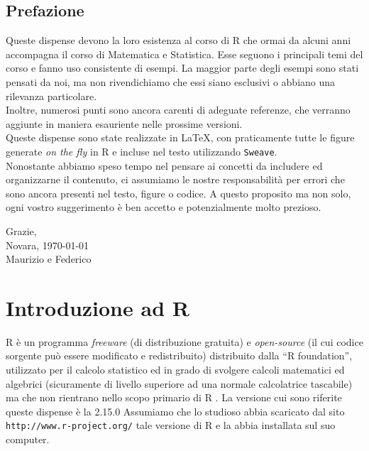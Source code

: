 \documentclass[onecolumn,11pt]{book}
\author{Federico Comoglio e  Maurizio Rinaldi}
\begin{document}

\markright{\today}
\thispagestyle{empty} 
\maketitle
\newpage
\thispagestyle{empty} 
\tableofcontents
\newpage
\thispagestyle{empty} 
 \mainmatter
\section*{Prefazione}
\rhead{}
Queste dispense devono la loro  esistenza al corso di \textsf{R} che ormai da alcuni anni accompagna il corso di Matematica e Statistica. Esse seguono i principali temi del corso e fanno uso consistente di esempi. La maggior parte degli esempi sono stati pensati da noi, ma non rivendichiamo che essi siano esclusivi o abbiano una rilevanza particolare.\\
Inoltre, numerosi punti sono ancora carenti di adeguate referenze, che verranno aggiunte in maniera esauriente nelle prossime versioni.\\
Queste dispense sono state realizzate in \LaTeX, con praticamente tutte le figure generate \textit{on the fly} in \textsf{R} e incluse nel testo utilizzando \texttt{Sweave}.\\
Nonostante abbiamo speso tempo nel pensare ai concetti da includere ed organizzarne il contenuto, ci assumiamo le nostre responsabilit\`a per errori che sono ancora presenti nel testo, figure o codice. A questo proposito ma non solo, ogni vostro suggerimento \`e ben accetto e potenzialmente molto prezioso.\\
\begin{flushright}
Grazie,\\
Novara, \today \\ 
Maurizio e Federico
\end{flushright}
\vfill\eject
 \thispagestyle{empty} 
\chapter{Introduzione ad \textsf{R}}
{\textsf R} \`e un programma \textit{freeware} (di distribuzione gratuita) e \textit{open-source} (il cui codice sorgente pu\`o essere modificato e redistribuito) distribuito dalla ``\textsf{R} foundation'', utilizzato per il calcolo statistico ed in grado di svolgere calcoli matematici ed algebrici (sicuramente di livello superiore ad una normale calcolatrice tascabile) ma che non rientrano nello scopo primario di \textsf{R} . La versione cui sono riferite queste dispense \`e la  2.15.0  Assumiamo che lo studioso abbia scaricato dal sito  \texttt{http://www.r-project.org/} tale versione di  \textsf{R} e la abbia installata sul suo computer.
\end{document}
